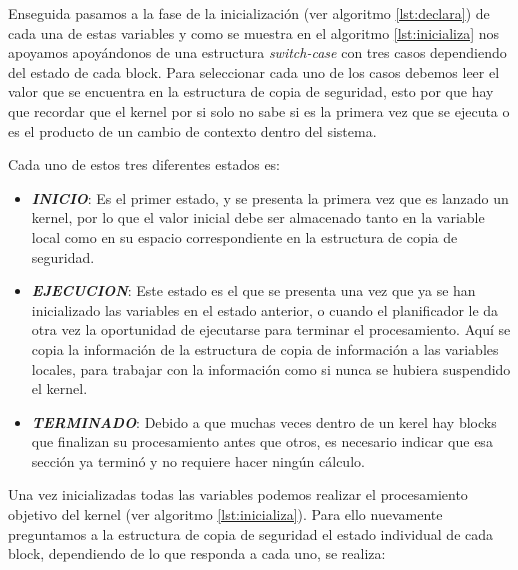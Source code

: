 

Enseguida pasamos a la fase de la inicialización (ver algoritmo \ref{lst:declara}) de cada una de estas variables y como se muestra en el algoritmo \ref{lst:inicializa} nos apoyamos apoyándonos de una estructura \textit{switch-case} con tres casos dependiendo del estado de cada block. Para seleccionar cada uno de los casos debemos leer el valor que se encuentra en la estructura de copia de seguridad, esto por que hay que recordar que el kernel por si solo no sabe si es la primera vez que se ejecuta o es el producto de un cambio de contexto dentro del sistema.
\newline

Cada uno de estos tres diferentes estados es:

\begin{itemize}
\item \textit{\textbf{INICIO}}: Es el primer estado, y se presenta la primera vez que es lanzado un kernel, por lo que el valor inicial debe ser almacenado tanto en la variable local como en su espacio correspondiente en la estructura de copia de seguridad.

\item \textit{\textbf{EJECUCION}}: Este estado es el que se presenta una vez que ya se han inicializado las variables en el estado anterior, o cuando el planificador le da otra vez la oportunidad de ejecutarse para terminar el procesamiento. Aquí se copia la información de la estructura de copia de información a las variables locales, para trabajar con la información como si nunca se hubiera suspendido el kernel.

\item \textit{\textbf{TERMINADO}}: Debido a que muchas veces dentro de un kerel hay blocks que finalizan su procesamiento antes que otros, es necesario indicar que esa sección ya terminó y no requiere hacer ningún cálculo.
\end{itemize}



Una vez inicializadas todas las variables podemos realizar el procesamiento objetivo del kernel (ver algoritmo \ref{lst:inicializa}). Para ello nuevamente preguntamos a la estructura de copia de seguridad el estado individual de cada block, dependiendo de lo que responda a cada uno, se realiza:

